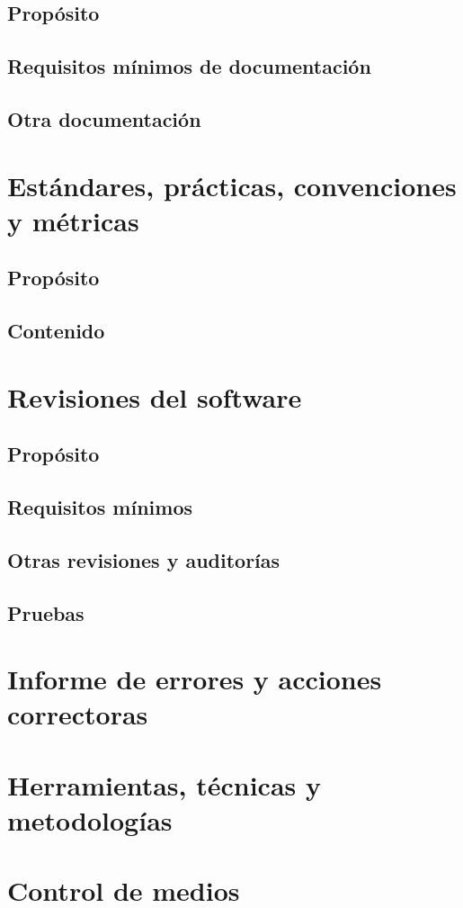\documentclass[11pt, a4paper, twoside, titlepage]{article}
\begin{document}
		\subsection{Propósito}
		\subsection{Requisitos mínimos de documentación}
		\subsection{Otra documentación}
	\section{Estándares, prácticas, convenciones y métricas}
		\subsection{Propósito}
		\subsection{Contenido}
	\section{Revisiones del software}
		\subsection{Propósito}
		\subsection{Requisitos mínimos}
		\subsection{Otras revisiones y auditorías}
		\subsection{Pruebas}
	\section{Informe de errores y acciones correctoras}
	\section{Herramientas, técnicas y metodologías}
	\section{Control de medios}
\end{document}
